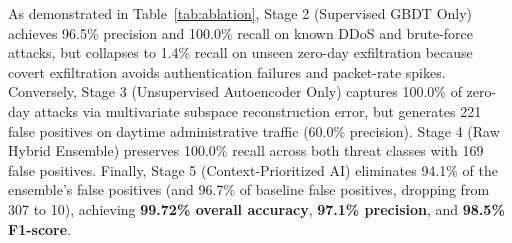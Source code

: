 \documentclass[10pt,a4paper]{article}
\begin{document}
\begin{table}[htbp]
\centering
\caption{Five-Stage Ablation Study on Held-Out Chronological Test Partition ($N_{\text{test}} = 3,600$ Flows)}
\label{tab:ablation}
\renewcommand{\arraystretch}{1.25}
\end{table}

As demonstrated in Table~\ref{tab:ablation}, Stage 2 (Supervised GBDT Only) achieves 96.5\% precision and 100.0\% recall on known DDoS and brute-force attacks, but collapses to 1.4\% recall on unseen zero-day exfiltration because covert exfiltration avoids authentication failures and packet-rate spikes. Conversely, Stage 3 (Unsupervised Autoencoder Only) captures 100.0\% of zero-day attacks via multivariate subspace reconstruction error, but generates 221 false positives on daytime administrative traffic (60.0\% precision). Stage 4 (Raw Hybrid Ensemble) preserves 100.0\% recall across both threat classes with 169 false positives. Finally, Stage 5 (Context-Prioritized AI) eliminates 94.1\% of the ensemble's false positives (and 96.7\% of baseline false positives, dropping from 307 to 10), achieving \textbf{99.72\% overall accuracy}, \textbf{97.1\% precision}, and \textbf{98.5\% F1-score}.
\end{document}
